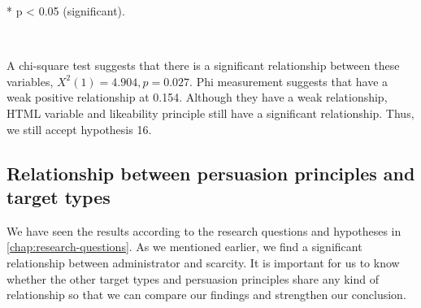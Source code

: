 {*} p < 0.05 (significant).

\ 

A chi-square test suggests that there is a significant relationship
between these variables, $X^{2}(1)=4.904,p=0.027$. Phi measurement
suggests that have a weak positive relationship at 0.154. Although
they have a weak relationship, HTML variable and likeability principle
still have a significant relationship. Thus, we still accept hypothesis
16.


\subsection{\label{sub:Relationship-between-persuasion}Relationship between
persuasion principles and target types}

We have seen the results according to the research questions and hypotheses
in \autoref{chap:research-questions}. As we mentioned earlier, we
find a significant relationship between administrator and scarcity.
It is important for us to know whether the other target types and
persuasion principles share any kind of relationship so that we can
compare our findings and strengthen our conclusion. 

